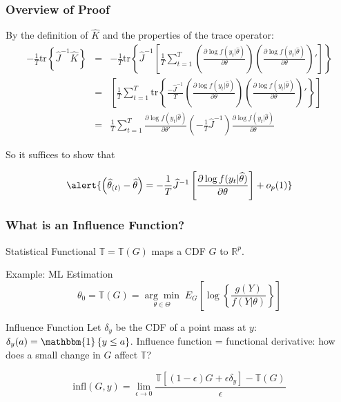 \begin{frame}
  \frametitle{Overview of Proof}

By the definition of $\widehat{K}$ and the properties of the trace operator:
\footnotesize
\begin{eqnarray*}
		-\frac{1}{T}\mbox{tr}\left\{\widehat{J}^{-1} \widehat{K} \right\}
		&=& -\frac{1}{T}\mbox{tr}\left\{\widehat{J}^{-1}\left[\frac{1}{T}\sum_{t=1}^T \left(\frac{\partial \log f(y_t|\widehat{\theta})}{\partial \theta}\right) \left(\frac{\partial \log f(y_t|\widehat{\theta})}{\partial \theta}\right) '\right]\right\}\\ 
    &=& \left[\frac{1}{T}\sum_{t=1}^T \mbox{tr}\left\{\frac{-\widehat{J}^{-1}}{T}\left(\frac{\partial \log f(y_t|\widehat{\theta})}{\partial \theta}\right) \left(\frac{\partial \log f(y_t|\widehat{\theta})}{\partial \theta}\right) '\right\}\right]\\ 
    &=& \frac{1}{T}\sum_{t=1}^T \frac{\partial \log f(y_t|\widehat{\theta})}{\partial \theta'} \left(-\frac{1}{T}\widehat{J}^{-1}\right)\frac{\partial \log f(y_t|\widehat{\theta})}{\partial \theta} 
\end{eqnarray*}


\normalsize
So it suffices to show that
\vspace{-1em}

\[
  \alert{\left( \widehat{\theta}_{(t)} - \widehat{\theta}  \right) = -\frac{1}{T} \widehat{J}^{-1} \left[\frac{\partial \log f(y_t|\widehat{\theta})}{\partial \theta}\right] + o_p(1)}
\]

\end{frame}
\begin{frame}
  \frametitle{What is an Influence Function?}

  \begin{block}{Statistical Functional}
    $\mathbb{T}=\mathbb{T}(G)$ maps a CDF $G$ to $\mathbb{R}^p$.
  \end{block}

  

  \begin{block}{Example: ML Estimation}
    \vspace{-2em}
    \[\theta_0 = \mathbb{T}(G) = \underset{\theta \in \Theta}{\arg \min} \;E_G\left[\log\left\{\frac{g(Y)}{f(Y|\theta)} \right\} \right]\]
  \end{block}

  

  \begin{block}{Influence Function}
    Let $\delta_y$ be the CDF of a \alert{point mass} at $y$:  $\delta_y(a) = \mathbbm{1}\left\{ y \leq a \right\}$.
    Influence function = functional derivative: how does a small change in $G$ affect $\mathbb{T}$?

    \[\text{infl}(G,y) = \lim_{\epsilon \rightarrow 0} \frac{\mathbb{T}\left[\left(1-\epsilon\right)G + \epsilon \delta_y\right] - \mathbb{T}(G)}{\epsilon}\]
  \end{block}
\end{frame}
